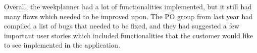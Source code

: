 Overall, the weekplanner had a lot of functionalities implemented, but it still had many flaws which needed to be improved upon.
The PO group from last year had compiled a list of bugs that needed to be fixed, and they had suggested a few important user stories which included functionalities that the customer would like to see implemented in the application.
